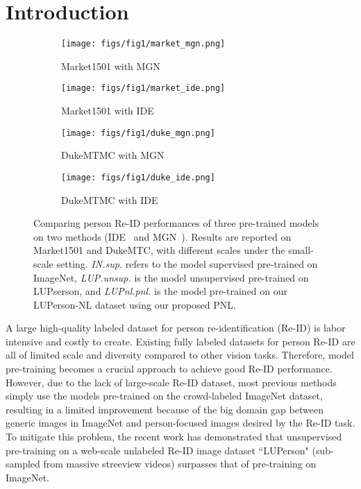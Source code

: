 \documentclass[10pt,twocolumn,letterpaper]{article}
\begin{document}
\vspace{-0.5cm}
\section{Introduction}
\label{sec:intro}

\begin{figure}[t]
\begin{center}
    \begin{subfigure}{1.62in}
        \centering\texttt{[image: figs/fig1/market\_mgn.png]}
        \vspace{-0.5cm}
        \caption{Market1501 with MGN}
    \end{subfigure}
    \begin{subfigure}{1.62in}
        \centering\texttt{[image: figs/fig1/market\_ide.png]}
        \vspace{-0.5cm}
        \caption{Market1501 with IDE}
    \end{subfigure}
    \begin{subfigure}{1.62in}
        \centering\texttt{[image: figs/fig1/duke\_mgn.png]}
        \vspace{-0.5cm}
        \caption{DukeMTMC with MGN}
    \end{subfigure}
    \begin{subfigure}{1.62in}
        \centering\texttt{[image: figs/fig1/duke\_ide.png]}
        \vspace{-0.5cm}
        \caption{DukeMTMC with IDE}
    \end{subfigure}
\end{center}
\caption{
Comparing person Re-ID performances of three pre-trained models on two methods (IDE~\cite{zheng2017person} and MGN~\cite{wang2018learning}). Results are reported on Market1501 and DukeMTC, with different scales under the small-scale setting. \emph{IN.sup.} refers to the model supervised pre-trained on ImageNet, \emph{LUP.unsup.} is the model unsupervised pre-trained on LUPserson, and \emph{LUPnl.pnl.} is the model pre-trained on our LUPerson-NL dataset using our proposed PNL.
}
\label{fig:onecol}
\end{figure}

A large high-quality labeled dataset for person re-identification (Re-ID) is labor intensive and costly to create. Existing fully labeled datasets \cite{wei2018person,karanam2016comprehensive,Zheng2015ScalablePR,zheng2017unlabeled} for person Re-ID are all of limited scale and diversity compared to other vision tasks. Therefore, model pre-training becomes a crucial approach to achieve good Re-ID performance. However, due to the lack of large-scale Re-ID dataset, most previous methods simply use the models pre-trained on the crowd-labeled ImageNet dataset, resulting in a limited improvement because of the big domain gap between generic images in ImageNet and person-focused images desired by the Re-ID task. To mitigate this problem, the recent work \cite{fu2020unsupervised} has demonstrated that unsupervised pre-training on a web-scale unlabeled Re-ID image dataset ``LUPerson" (sub-sampled from massive streeview videos) surpasses that of pre-training on ImageNet.
\end{document}
